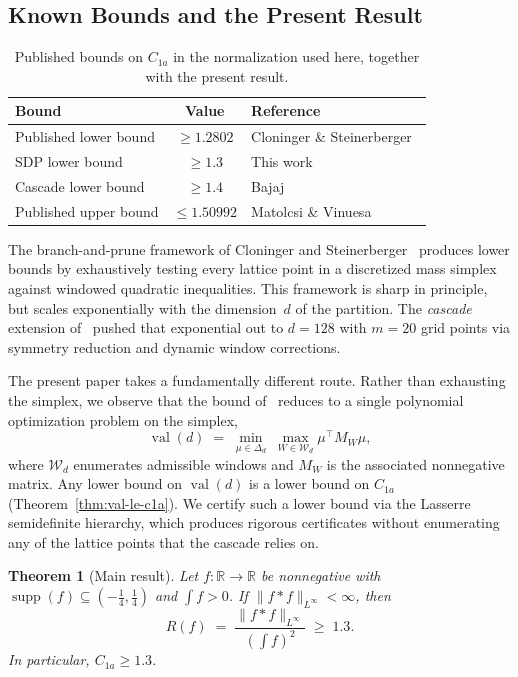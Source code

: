 \documentclass[11pt, letterpaper]{article}
\theoremstyle{paperplain}
\newtheorem{theorem}{Theorem}[section]
\theoremstyle{paperdef}
\newcommand{\R}{\mathbb{R}}
\newcommand{\supp}{\operatorname{supp}}
\newcommand{\val}{\operatorname{val}}
\begin{document}
\subsection{Known Bounds and the Present Result}

\begin{table}[t]
\centering
\begin{tabular}{lcl}
  \toprule
  \textbf{Bound} & \textbf{Value} & \textbf{Reference} \\
  \midrule
  Published lower bound & $\ge 1.2802$  & Cloninger \& Steinerberger~\cite{CS17} \\
  SDP lower bound       & $\ge 1.3$     & This work \\
  Cascade lower bound   & $\ge 1.4$     & Bajaj~\cite{BajajCS2026} \\
  Published upper bound & $\le 1.50992$ & Matolcsi \& Vinuesa~\cite{MV10} \\
  \bottomrule
\end{tabular}
\caption[Published bounds on C1a in the normalization used here.]{Published bounds on $C_{1a}$ in the normalization used here,
  together with the present result.}
\label{tab:published-bounds}
\end{table}

The branch-and-prune framework of Cloninger and
Steinerberger~\cite{CS17} produces lower bounds by exhaustively testing
every lattice point in a discretized mass simplex against windowed
quadratic inequalities.  This framework is sharp in principle, but
scales exponentially with the dimension~$d$ of the partition.  The
\emph{cascade} extension of~\cite{BajajCS2026} pushed that exponential
out to $d=128$ with $m=20$ grid points via symmetry reduction and
dynamic window corrections.

The present paper takes a fundamentally different route.  Rather than
exhausting the simplex, we observe that the bound of~\cite{CS17}
reduces to a single polynomial optimization problem on the simplex,
\[
  \val(d)
  \;=\;
  \min_{\mu \in \Delta_d}\;
  \max_{W \in \mathcal{W}_d}
  \mu^\top M_W \mu,
\]
where $\mathcal{W}_d$ enumerates admissible windows and $M_W$ is the
associated nonnegative matrix.  Any lower bound on $\val(d)$ is a lower
bound on $C_{1a}$ (Theorem~\ref{thm:val-le-c1a}).  We certify such a
lower bound via the Lasserre semidefinite hierarchy, which produces
rigorous certificates without enumerating any of the lattice points
that the cascade relies on.

\begin{theorem}[Main result]
\label{thm:main}
Let $f : \R \to \R$ be nonnegative with
$\supp(f) \subseteq (-\tfrac14,\tfrac14)$ and $\int f > 0$.  If
$\|f*f\|_{L^\infty} < \infty$, then
\[
  R(f)
  \;=\;
  \frac{\|f*f\|_{L^\infty}}{\left(\int f\right)^2}
  \;\ge\;
  1.3.
\]
In particular, $C_{1a} \ge 1.3$.
\end{theorem}
\end{document}
